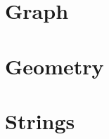 \documentclass[10pt, a4paper, twocolumn, oneside]{article}
\begin{document}
\section{Graph}

\section{Geometry}

\section{Strings}
\end{document}
